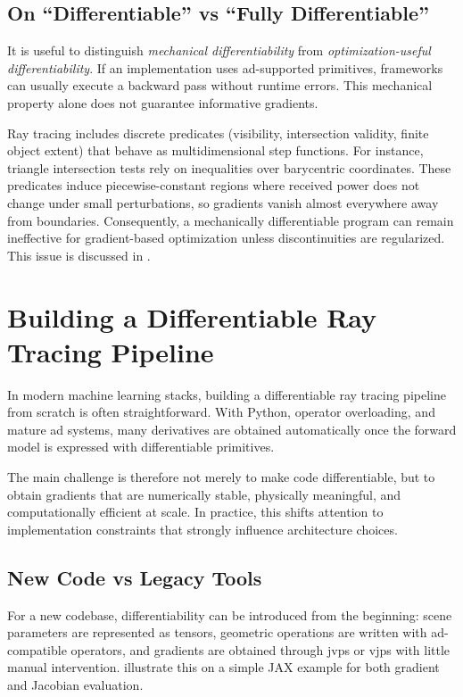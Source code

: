 \subsection{On \enquote{Differentiable} vs \enquote{Fully Differentiable}}

It is useful to distinguish \emph{mechanical differentiability} from \emph{optimization-useful differentiability}. If an implementation uses \gls{ad}-supported primitives, frameworks can usually execute a backward pass without runtime errors. This mechanical property alone does not guarantee informative gradients.

Ray tracing includes discrete predicates (visibility, intersection validity, finite object extent) that behave as multidimensional step functions. For instance, triangle intersection tests rely on inequalities over barycentric coordinates. These predicates induce piecewise-constant regions where received power does not change under small perturbations, so gradients vanish almost everywhere away from boundaries. Consequently, a mechanically differentiable program can remain ineffective for gradient-based optimization unless discontinuities are regularized. This issue is discussed in .

\section{Building a Differentiable Ray Tracing Pipeline}

In modern machine learning stacks, building a differentiable ray tracing pipeline from scratch is often straightforward. With Python, operator overloading, and mature \gls{ad} systems, many derivatives are obtained automatically once the forward model is expressed with differentiable primitives.

The main challenge is therefore not merely to make code differentiable, but to obtain gradients that are numerically stable, physically meaningful, and computationally efficient at scale. In practice, this shifts attention to implementation constraints that strongly influence architecture choices.

\subsection{New Code vs Legacy Tools}

For a new codebase, differentiability can be introduced from the beginning: scene parameters are represented as tensors, geometric operations are written with \gls{ad}-compatible operators, and gradients are obtained through \glspl{jvp} or \glspl{vjp} with little manual intervention.  illustrate this on a simple JAX example for both gradient and Jacobian evaluation.

